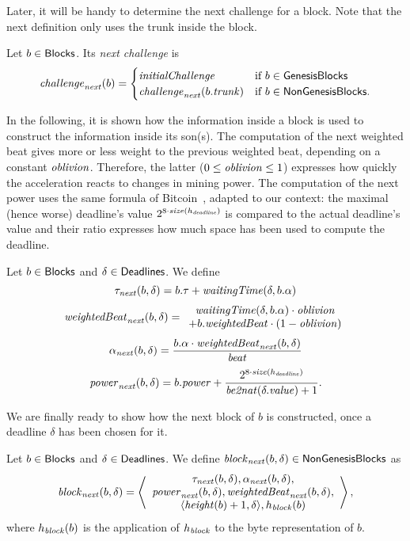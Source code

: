 Later, it will be handy to determine the next challenge for a block. Note that
the next definition only uses the trunk inside the block.
%
\begin{definition}\label{def:next_challenge_from_block}
  Let $b\in{\mathsf{Blocks}}$. Its \emph{next challenge} is
  \[
  {\mathit{challenge}}_{\mathit{next}}(b)=\begin{cases}
  {\mathit{initialChallenge}} & \text{if $b\in{\mathsf{GenesisBlocks}}$}\\
  {\mathit{challenge}}_{\mathit{next}}(b.{\mathit{trunk}}) & \text{if $b\in{\mathsf{NonGenesisBlocks}}$.}
  \end{cases}
  \]
\end{definition}

In the following, it is shown how the information inside a block is used to construct
the information inside its son(s). The computation of the next weighted beat
gives more or less weight to the previous weighted beat, depending on a constant ${\mathit{oblivion}}$.
Therefore, the latter ($0\le{\mathit{oblivion}}\le 1$) expresses how quickly the acceleration reacts to changes
in mining power. The computation of the next power uses the same formula of Bitcoin~\cite{WalkerG24},
adapted to our context: the maximal (hence worse) deadline's value $2^{8\cdot{\mathit{size}}(h_{\mathit{deadline}})}$ is compared
to the actual deadline's value and their ratio expresses how much space has been used to compute the deadline.
%
\begin{definition}\label{def:next}
  Let $b\in{\mathsf{Blocks}}$ and $\delta\in{\mathsf{Deadlines}}$. We define
  \[
  \tau_{\mathit{next}}(b,\delta)=b.\tau+{\mathit{waitingTime}}(\delta,b.\alpha)
  \]
  \[
  \mathit{weightedBeat}_{\mathit{next}}(b,\delta)=\begin{array}{c}
  {\mathit{waitingTime}}(\delta,b.\alpha)\cdot{\mathit{oblivion}}\\
  +b.\mathit{weightedBeat}\cdot(1-{\mathit{oblivion}})
  \end{array}
  \]
  \[
  \alpha_{\mathit{next}}(b,\delta)=\frac{b.\alpha\cdot\mathit{weightedBeat}_{\mathit{next}}(b,\delta)}{{\mathit{beat}}}
  \]
  \[
  {\mathit{power}}_{\mathit{next}}(b,\delta)=b.{\mathit{power}}+\frac{2^{8\cdot{\mathit{size}}(h_{\mathit{deadline}})}}{{\mathit{be2nat}}(\delta.\mathit{value})+1}.
  \]
\end{definition}

We are finally ready to show how the next block of $b$ is constructed, once
a deadline $\delta$ has been chosen for it.
%
\begin{definition}\label{def:next_block}
  Let $b\in{\mathsf{Blocks}}$ and $\delta\in{\mathsf{Deadlines}}$. We define
  ${\mathit{block}}_{\mathit{next}}(b,\delta)\in{\mathsf{NonGenesisBlocks}}$ as
  \[
  {\mathit{block}}_{\mathit{next}}(b,\delta)=\left\langle\begin{array}{c}
  \tau_{\mathit{next}}(b,\delta),\alpha_{\mathit{next}}(b,\delta),\\
  {\mathit{power}}_{\mathit{next}}(b,\delta),\mathit{weightedBeat}_{\mathit{next}}(b,\delta),\\
  \langle{\mathit{height}}(b)+1,\delta\rangle,h_{\mathit{block}}(b)
  \end{array}\right\rangle,
  \]
  where $h_{\mathit{block}}(b)$ is the application of $h_{\mathit{block}}$ to the byte representation of $b$.
\end{definition}

